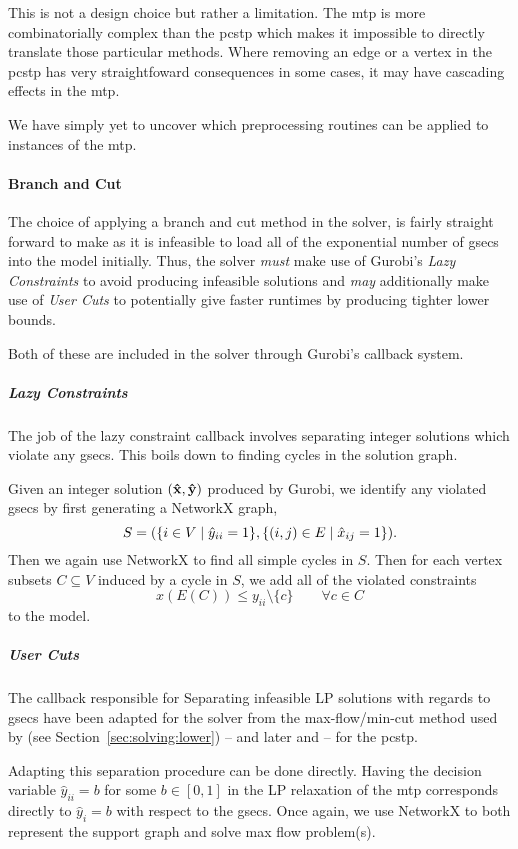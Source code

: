 This is not a design choice but rather a limitation. The \gls{mtp} is
more combinatorially
complex than the \gls{pcstp} which makes it impossible to directly translate those particular
methods. Where removing an edge or a vertex in the \gls{pcstp}
has very straightfoward consequences in
some cases, it may have cascading effects in the \gls{mtp}.

We have simply yet to uncover which preprocessing routines can be applied to instances of
the \gls{mtp}.

\paragraph{Branch and Cut}
The choice of applying a branch and cut method in the solver, is fairly straight
forward to make as it is infeasible to load all of the exponential number of
\glspl{gsec} into the model initially. Thus, the solver
\textit{must} make use of
Gurobi's \textit{Lazy Constraints} to avoid producing infeasible solutions
and \textit{may} additionally make use of \textit{User Cuts} to potentially
give faster runtimes by producing tighter lower bounds.

Both of these are included in the solver through Gurobi's callback system.
\subparagraph{Lazy Constraints}
The job of the lazy constraint callback involves separating integer solutions
which violate any \glspl{gsec}. This boils down to finding cycles in the solution
graph.

Given an integer solution $(\mathbf{\hat{x}}, \mathbf{\hat{y}})$ produced by Gurobi, we
identify any violated \glspl{gsec} by first generating a NetworkX graph,
\[S = (\{i \in V \mid \hat y_{ii} = 1 \}, \{ (i, j) \in E \mid \hat x_{ij} = 1\})\mathnormal{.}\]
Then we again use NetworkX to find all simple cycles in $S$. Then for each vertex
subsets $C \subseteq V$ induced by a cycle
in $S$, we add all of the violated constraints
\[x(E(C)) \leq y_{ii} \setminus \{c\} \qquad \forall c \in C\]
to the model.
\subparagraph{User Cuts}
The callback responsible for
Separating infeasible LP solutions with regards to \glspl{gsec}
have been adapted for the solver from the max-flow/min-cut  method used by \citet{lucena2004strong}
 (see Section~\ref{sec:solving:lower})
-- and later \citet{ljubic2005solving} and \citet{gamrath2017scip} -- for the \gls{pcstp}.

Adapting this separation procedure can be done directly. Having the decision variable
$\hat y_{ii} = b$ for some $b \in [0,1]$ in the LP relaxation of
the \gls{mtp} corresponds directly to $\hat y_i = b$ with respect to the \glspl{gsec}.
Once again, we use NetworkX to both represent the support graph and solve max flow problem(s).


